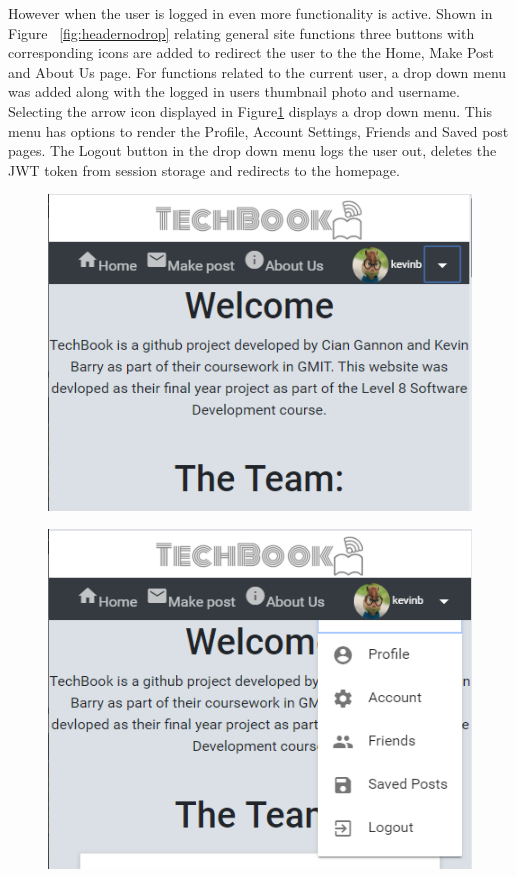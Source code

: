 However when the user is logged in even more functionality is active. Shown in Figure  ~\ref{fig:headernodrop} relating general site functions three buttons with corresponding icons are added to redirect the user to the the Home, Make Post and About Us page. For functions related to the current user, a drop down menu was added along with the logged in users thumbnail photo and username. Selecting the arrow icon displayed in Figure\ref{fig:headerdrop} displays a drop down menu. This menu has options to render the Profile, Account Settings, Friends and Saved post pages. The Logout button in the drop down menu logs the user out, deletes the JWT token from session storage and redirects to the homepage. 
\begin{figure}[H]
\centering
\begin{minipage}{.5\textwidth}
  \centering
  \includegraphics[width=.9\linewidth]{img/ui/headernodrop.PNG}
  \label{fig:headernodrop}
\end{minipage}%
\begin{minipage}{.5\textwidth}
  \centering
  \includegraphics[width=.9\linewidth]{img/ui/headerdrop.PNG}
  \label{fig:headerdrop}
\end{minipage}
\end{figure}



